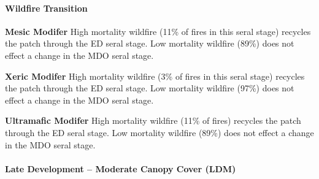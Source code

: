 \paragraph{Wildfire Transition}
\begin{adjustwidth}{2cm}{}
\textbf{Mesic Modifer } High mortality wildfire (11\% of fires in this seral stage) recycles the patch through the ED seral stage. Low mortality wildfire (89\%) does not effect a change in the MDO seral stage. 

\medskip
\noindent \textbf{Xeric Modifer} High mortality wildfire (3\% of fires in this seral stage) recycles the patch through the ED seral stage. Low mortality wildfire (97\%) does not effect a change in the MDO seral stage.

\medskip
\noindent \textbf{Ultramafic Modifer} High mortality wildfire (11\% of fires) recycles the patch through the ED seral stage. Low mortality wildfire (89\%) does not effect a change in the MDO seral stage.

\end{adjustwidth}
\noindent\hrulefill

\paragraph{Late Development – Moderate Canopy Cover (LDM)}

